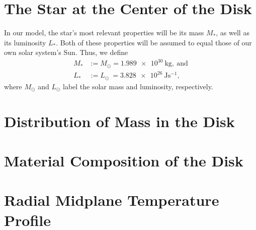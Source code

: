 \section{The Star at the Center of the Disk}


    In our model, the star's most relevant properties will be its mass $M_*$, as well as its
    luminosity $L_*$. Both of these properties will be assumed to equal those of our own solar
    system's Sun. Thus, we define
    \begin{align*}
        M_*&:=M_\odot=\SI{1.989e30}{\kg},\ \text{and}\\
        L_*&:=L_\odot\ =\SI{3.828e26}{\joule\second^{-1}},
    \end{align*}
    where $M_\odot$ and $L_\odot$ label the solar mass and luminosity, respectively. \\

\section{Distribution of Mass in the Disk}
\section{Material Composition of the Disk}
\section{Radial Midplane Temperature Profile}

